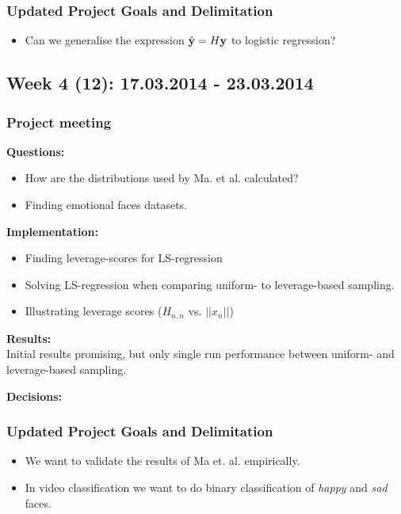 \documentclass[11pt, a4paper]{article} %
\begin{document}
\subsubsection*{Updated Project Goals and Delimitation}
\begin{itemize}
\item Can we generalise the expression $\hat{{\bf y}} = H {\bf y}$ to logistic regression?
\end{itemize}

\subsection*{Week 4 (12): 17.03.2014 - 23.03.2014}
\subsubsection*{Project meeting}
\textbf{Questions:}\\
\begin{itemize}
\item How are the distributions used by Ma. et al. calculated?
\item Finding emotional faces datasets.
\end{itemize}

\textbf{Implementation:}\\
\begin{itemize}
\item Finding leverage-scores for LS-regression
\item Solving LS-regression when comparing uniform- to leverage-based sampling.
\item Illustrating leverage scores ($H_{n,n}$ vs. $||x_n||$)
\end{itemize}

\textbf{Results:}\\
Initial results promising, but only single run performance between uniform- and leverage-based sampling.

\textbf{Decisions:}\\

\subsubsection*{Updated Project Goals and Delimitation}
\begin{itemize}
\item We want to validate the results of Ma et. al. empirically.
\item In video classification we want to do binary classification of \emph{happy} and \emph{sad} faces.
\end{itemize}
\end{document}
